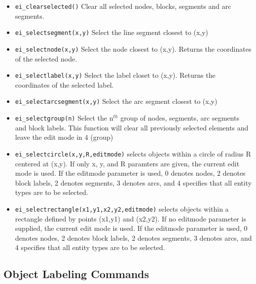 \begin{itemize}
\item {\tt ei\_clearselected()} Clear all selected nodes, blocks, segments and arc
segments.

\item {\tt ei\_selectsegment(x,y)} Select the line segment closest to (x,y)

\item {\tt ei\_selectnode(x,y)} Select the node closest to (x,y).
Returns the coordinates of the selected node.

\item {\tt ei\_selectlabel(x,y)} Select the label closet to (x,y).
Returns the coordinates of the selected label.

\item {\tt ei\_selectarcsegment(x,y)} Select the arc segment closest to (x,y)

\item {\tt ei\_selectgroup(n)} Select the n$^{th}$ group of nodes, segments, arc
segments and block labels. This function will clear all previously selected
elements and leave the edit mode in 4 (group)

\item{\tt ei\_selectcircle(x,y,R,editmode)} selects objects within a circle of radius
R centered at (x,y).  If only x, y, and R paramters are given, the current
edit mode is used.  If the editmode parameter is used, 0 denotes nodes, 2
denotes block labels, 2 denotes segments, 3 denotes arcs, and 4 specifies
that all entity types are to be selected.

\item{\tt ei\_selectrectangle(x1,y1,x2,y2,editmode)} selects objects within a rectangle
defined by points (x1,y1) and (x2,y2). If no editmode parameter is supplied,
the current edit mode is used.  If the editmode parameter is used, 0 denotes
nodes, 2 denotes block labels, 2 denotes segments, 3 denotes arcs, and 4
specifies that all entity types are to be selected.
\end{itemize}


\subsection{Object Labeling Commands}

